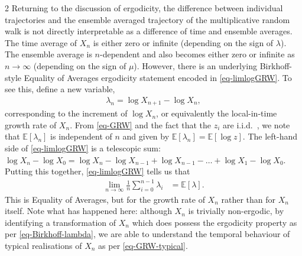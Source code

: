 \documentclass[11pt]{article}
\begin{document}
\begin{multicols}{2}
Returning to the discussion of ergodicity, the difference between individual trajectories and the ensemble averaged trajectory of the multiplicative random walk is not directly interpretable as a difference of time and ensemble averages.
 The time average of $X_n$ is either zero or infinite (depending on the sign of $\lambda$). The ensemble average is $n$-dependent and also becomes either zero or infinite as $n \to \infty$ (depending on the sign of $\mu$).
However, there {is} an underlying Birkhoff-style Equality of Averages ergodicity statement encoded in \eqref{eq-limlogGRW}.
To see this, define a new variable,
\begin{align}
\lambda_n = \log X_{n+1} - \log X_{n}, \label{eq-ergodic-observable}
\end{align}
corresponding to the increment of $\log X_n$, or equivalently the local-in-time growth rate of $X_n$.
From \eqref{eq-GRW} and the fact that the $z_i$ are i.i.d.\ , we note that $\mathbb{E}\left[ \lambda_n \right]$ is independent of $n$ and given by $\mathbb{E}\left[ \lambda_n \right] = \mathbb{E}\left[ \log z \right]$.
The left-hand side of \eqref{eq-limlogGRW} is a telescopic sum: $\log X_n - \log X_0 = \log X_n - \log X_{n-1} + \log X_{n-1} - \ldots + \log X_1 - \log X_0$.
Putting this together, \eqref{eq-limlogGRW} tells us that
\begin{align}
\label{eq-Birkhoff-lambda}
\lim_{n \to \infty} \frac{1}{n} \sum_{i=0}^{n-1} \lambda_i  &= \mathbb{E}\left[ \lambda \right].
\end{align}
This is Equality of Averages, but for the growth rate of $X_n$ rather than for $X_n$ itself.
Note what has happened here: although $X_n$ is trivially non-ergodic, by identifying a transformation of $X_n$ which does possess the ergodicity property  as per \eqref{eq-Birkhoff-lambda}, we are able to understand the temporal behaviour of typical realisations of $X_n$ as per \eqref{eq-GRW-typical}.


\end{multicols}
\end{document}
